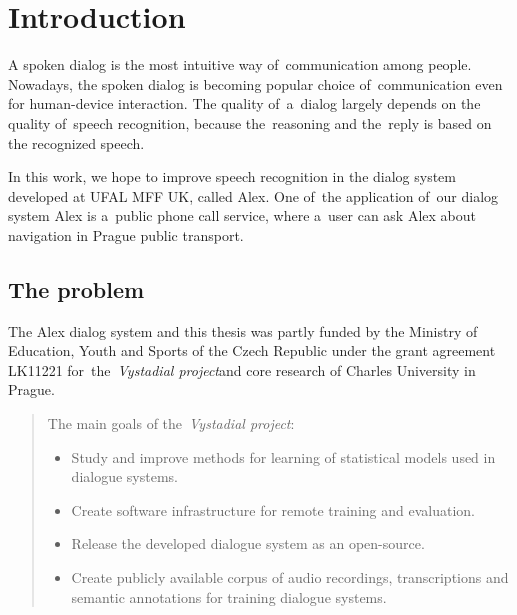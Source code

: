 \chapter{Introduction}
\label{chap:intro}

% 
% 
% 

A spoken dialog is the most intuitive way of~communication among people. Nowadays, the spoken dialog is becoming popular choice of~communication even for human-device interaction. The quality of~a~dialog largely depends on the quality of~speech recognition, because the~reasoning and the~reply is based on the recognized speech. 

In this work, we hope to improve speech recognition in the dialog system developed at UFAL MFF UK, called Alex. One of~the application of~our dialog system Alex is a~public phone call service, where a~user can ask Alex about navigation in Prague public transport.

\section{The problem} 
\label{sec:why}
The Alex dialog system and this thesis was partly funded by the Ministry of Education, Youth and Sports
of the Czech Republic under the grant agreement LK11221 for~the~{\it Vystadial project}\/and core research of Charles University in Prague.
\begin{quote}
    The main goals of the~{\it Vystadial project}\/:
    \begin{itemize}
        \item Study and improve methods for learning of statistical models used in dialogue systems. 
        \item Create software infrastructure for remote training and evaluation.
        \item Release the developed dialogue system as an open-source.
        \item Create publicly available corpus of audio recordings, transcriptions and semantic annotations for training dialogue systems.
    \end{itemize}
\end{quote}

